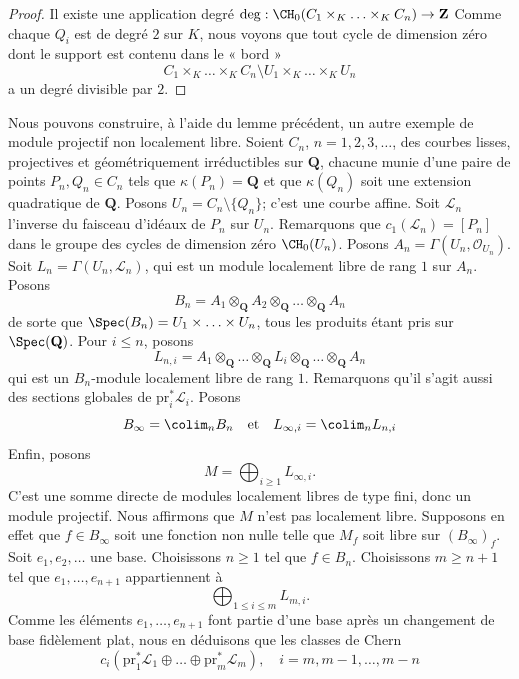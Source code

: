\begin{proof}
Il existe une application degré
$\deg : \CH_0(C_1 \times_K \ldots \times_K C_n) \to \mathbf{Z}$
Comme chaque $Q_i$ est de degré $2$ sur $K$, nous voyons que
tout cycle de dimension zéro dont le support est contenu dans le « bord »
$$
C_1 \times_K \ldots \times_K C_n
\setminus
U_1 \times_K \ldots \times_K U_n
$$
a un degré divisible par $2$.
\end{proof}

\noindent
Nous pouvons construire, à l'aide du lemme précédent, un autre exemple de
module projectif non localement libre. Soient
$C_n$, $n = 1, 2, 3, \ldots$, des courbes lisses, projectives et géométriquement
irréductibles sur $\mathbf{Q}$, chacune munie d'une paire de points
$P_n, Q_n \in C_n$ tels que $\kappa(P_n) = \mathbf{Q}$ et que
$\kappa(Q_n)$ soit une extension quadratique de $\mathbf{Q}$.
Posons $U_n = C_n \setminus \{Q_n\}$; c'est une courbe affine.
Soit $\mathcal{L}_n$ l'inverse du faisceau d'idéaux de $P_n$
sur $U_n$. Remarquons que $c_1(\mathcal{L}_n) = [P_n]$ dans le groupe des
cycles de dimension zéro $\CH_0(U_n)$. Posons $A_n = \Gamma(U_n, \mathcal{O}_{U_n})$.
Soit $L_n = \Gamma(U_n, \mathcal{L}_n)$, qui est un module localement
libre de rang $1$ sur $A_n$. Posons
$$
B_n = A_1 \otimes_{\mathbf{Q}} A_2 \otimes_{\mathbf{Q}} \ldots
\otimes_{\mathbf{Q}} A_n
$$
de sorte que $\Spec(B_n) = U_1 \times \ldots \times U_n$, tous les produits
étant pris sur $\Spec(\mathbf{Q})$. Pour $i \leq n$, posons
$$
L_{n, i} =
A_1 \otimes_{\mathbf{Q}} \ldots \otimes_{\mathbf{Q}} L_i
\otimes_{\mathbf{Q}} \ldots \otimes_{\mathbf{Q}} A_n
$$
qui est un $B_n$-module localement libre de rang $1$. Remarquons qu'il s'agit
aussi des sections globales de $\text{pr}_i^*\mathcal{L}_i$. Posons
$$
B_\infty = \colim_n B_n
\quad\text{et}\quad
L_{\infty, i} = \colim_n L_{n, i}
$$
Enfin, posons
$$
M = \bigoplus\nolimits_{i \geq 1} L_{\infty, i}.
$$
C'est une somme directe de modules localement libres de type fini, donc un module projectif.
Nous affirmons que $M$ n'est pas localement libre. Supposons en effet que
$f \in B_\infty$ soit une fonction non nulle telle que $M_f$ soit libre
sur $(B_\infty)_f$. Soit $e_1, e_2, \ldots$ une base. Choisissons
$n \geq 1$ tel que $f \in B_n$.
Choisissons $m \geq n + 1$ tel que $e_1, \ldots, e_{n + 1}$ appartiennent à
$$
\bigoplus\nolimits_{1 \leq i \leq m} L_{m, i}.
$$
Comme les éléments $e_1, \ldots, e_{n + 1}$ font partie d'une base
après un changement de base fidèlement plat, nous en déduisons que
les classes de Chern
$$
c_i(\text{pr}_1^*\mathcal{L}_1 \oplus \ldots \oplus
\text{pr}_m^*\mathcal{L}_m), \quad i = m, m - 1, \ldots, m - n
$$
